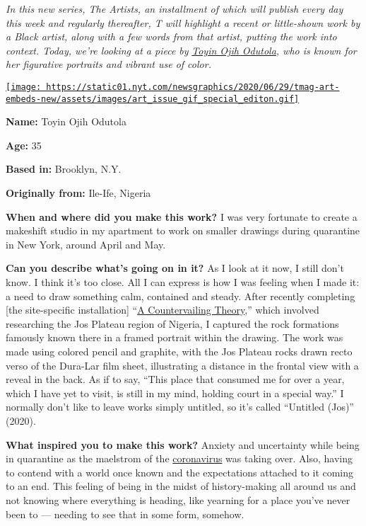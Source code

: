 \emph{In this new series, The Artists, an installment of which will
publish every day this week and regularly thereafter, T will highlight a
recent or little-shown work by a Black artist, along with a few words
from that artist, putting the work into context. Today, we're looking at
a piece by} \href{https://toyinojihodutola.com/}{\emph{Toyin Ojih
Odutola}}\emph{, who is known for her figurative portraits and vibrant
use of color.}

\href{https://www.nytimes.com/issue/t-magazine/2020/07/02/true-believers-art-issue}{\texttt{[image: https://static01.nyt.com/newsgraphics/2020/06/29/tmag-art-embeds-new/assets/images/art\_issue\_gif\_special\_editon.gif]}}

\textbf{Name:} Toyin Ojih Odutola

\textbf{Age:} 35

\textbf{Based in:} Brooklyn, N.Y.

\textbf{Originally from:} Ile-Ife, Nigeria

\textbf{When and where did you make this work?} I was very fortunate to
create a makeshift studio in my apartment to work on smaller drawings
during quarantine in New York, around April and May.

\textbf{Can you describe what's going on in it?} As I look at it now, I
still don't know. I think it's too close. All I can express is how I was
feeling when I made it: a need to draw something calm, contained and
steady. After recently completing {[}the site-specific installation{]}
``\href{https://www.barbican.org.uk/our-story/press-room/toyin-ojih-odutola-a-countervailing-theory}{A
Countervailing Theory},'' which involved researching the Jos Plateau
region of Nigeria, I captured the rock formations famously known there
in a framed portrait within the drawing. The work was made using colored
pencil and graphite, with the Jos Plateau rocks drawn recto verso of the
Dura-Lar film sheet, illustrating a distance in the frontal view with a
reveal in the back. As if to say, ``This place that consumed me for over
a year, which I have yet to visit, is still in my mind, holding court in
a special way.'' I normally don't like to leave works simply untitled,
so it's called ``Untitled (Jos)'' (2020).

\textbf{What inspired you to make this work?} Anxiety and uncertainty
while being in quarantine as the maelstrom of the
\href{https://www.nytimes.com/news-event/coronavirus}{coronavirus} was
taking over. Also, having to contend with a world once known and the
expectations attached to it coming to an end. This feeling of being in
the midst of history-making all around us and not knowing where
everything is heading, like yearning for a place you've never been to
--- needing to see that in some form, somehow.

